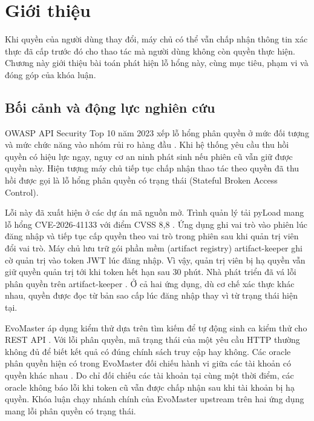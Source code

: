 \chapter{Giới thiệu}
\label{chap:intro}

Khi quyền của người dùng thay đổi, máy chủ có thể vẫn chấp nhận thông tin xác thực đã cấp trước đó cho thao tác mà người dùng không còn quyền thực hiện. Chương này giới thiệu bài toán phát hiện lỗ hổng này, cùng mục tiêu, phạm vi và đóng góp của khóa luận.

\section{Bối cảnh và động lực nghiên cứu}
\label{sec:intro_background}

OWASP API Security Top 10 năm 2023 xếp lỗ hổng phân quyền ở mức đối tượng và mức chức năng vào nhóm rủi ro hàng đầu \cite{owasp2023api}. Khi hệ thống yêu cầu thu hồi quyền có hiệu lực ngay, nguy cơ an ninh phát sinh nếu phiên cũ vẫn giữ được quyền này. Hiện tượng máy chủ tiếp tục chấp nhận thao tác theo quyền đã thu hồi được gọi là lỗ hổng phân quyền có trạng thái (Stateful Broken Access Control).

Lỗi này đã xuất hiện ở các dự án mã nguồn mở. Trình quản lý tải pyLoad mang lỗ hổng \mbox{CVE-2026-41133} với điểm CVSS 8,8 \cite{cve202641133}. Ứng dụng ghi vai trò vào phiên lúc đăng nhập và tiếp tục cấp quyền theo vai trò trong phiên sau khi quản trị viên đổi vai trò. Máy chủ lưu trữ gói phần mềm (artifact registry) artifact-keeper ghi cờ quản trị vào token JWT lúc đăng nhập. Vì vậy, quản trị viên bị hạ quyền vẫn giữ quyền quản trị tới khi token hết hạn sau 30 phút. Nhà phát triển đã vá lỗi phân quyền trên artifact-keeper \cite{artifactkeeper1821}. Ở cả hai ứng dụng, dù cơ chế xác thực khác nhau, quyền được đọc từ bản sao cấp lúc đăng nhập thay vì từ trạng thái hiện tại.

EvoMaster áp dụng kiểm thử dựa trên tìm kiếm để tự động sinh ca kiểm thử cho REST API \cite{arcuri2019evomaster}. Với lỗi phân quyền, mã trạng thái của một yêu cầu HTTP thường không đủ để biết kết quả có đúng chính sách truy cập hay không. Các oracle phân quyền hiện có trong EvoMaster đối chiếu hành vi giữa các tài khoản có quyền khác nhau \cite{sahin2024bola}. Do chỉ đối chiếu các tài khoản tại cùng một thời điểm, các oracle không báo lỗi khi token cũ vẫn được chấp nhận sau khi tài khoản bị hạ quyền. Khóa luận chạy nhánh chính của EvoMaster upstream trên hai ứng dụng mang lỗi phân quyền có trạng thái.

